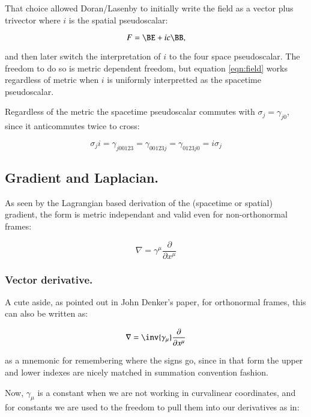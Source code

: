 \documentclass{article}
\newcommand{\grad}[0]{\nabla}
\newcommand{\PD}[2]{\frac{\partial {#2}}{\partial {#1}}}
\begin{document}
That choice allowed Doran/Lasenby to initially write the field as a vector plus trivector where $i$ is the spatial pseudoscalar:

\begin{equation}\label{eqn:field}
F = \BE + i c \BB,
\end{equation}

and then later switch the interpretation of $i$ to the four space pseudoscalar.  The freedom to do so is metric dependent freedom, but
equation \ref{eqn:field} works regardless of metric when $i$ is uniformly interpretted as the spacetime pseudoscalar.

Regardless of the metric the spacetime pseudoscalar commutes with $\sigma_j = \gamma_{j0}$, since it anticommutes twice to cross:

\begin{equation*}
\sigma_j i = \gamma_{j00123} = \gamma_{00123j} = \gamma_{0123j0} = i \sigma_j
\end{equation*}

\subsection{ Gradient and Laplacian. }

As seen by the Lagrangian based derivation of the (spacetime or spatial) gradient, the form is metric independant and valid even for non-orthonormal frames:

\begin{equation*}
\grad = \gamma^{\mu} \PD{x^{\mu}}{}
\end{equation*}

\subsubsection{ Vector derivative. }

A cute aside, as pointed out in John Denker's paper, for orthonormal frames, this can also be written as:

\begin{equation}\label{eqn:gradient}
\grad = \inv{\gamma_{\mu}} \PD{x^{\mu}}{}
\end{equation}

as a mnemonic for remembering where the signs go, since in that form the upper and lower indexes are nicely matched in summation convention fashion.

Now, $\gamma_{\mu}$ is a constant when we are not working in curvalinear coordinates, and for constants we are used to the freedom to pull them into our
derivatives as in:
\end{document}
